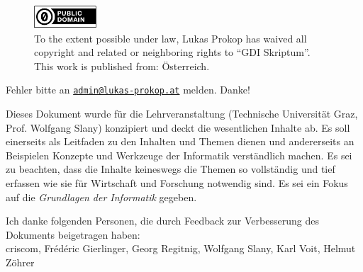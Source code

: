 \begin{titlepage}
  \begin{center}
    \begin{figure}[ht!]
      \begin{center}
        \includegraphics[width=88px,height=33px]{img/cc0.pdf} \\[20pt]%
        To the extent possible under law, Lukas Prokop has waived all copyright and related
        or neighboring rights to ``GDI Skriptum''. \\
        This work is published from: Österreich. 
      \end{center}
    \end{figure}
    \vspace{50pt}
    \noindent Fehler bitte an
    \href{mailto:admin@lukas-prokop.at}{\nolinkurl{admin@lukas-prokop.at}}
    melden. Danke!
    \vspace{50pt}

    Dieses Dokument wurde für die Lehrveranstaltung \courselfocs{}
    (Technische Universität Graz, Prof. Wolfgang Slany) konzipiert
    und deckt die wesentlichen Inhalte ab. Es soll einerseits als
    Leitfaden zu den Inhalten und Themen dienen und andererseits an Beispielen
    Konzepte und Werkzeuge der Informatik verständlich machen. Es sei zu beachten,
    dass die Inhalte keineswegs die Themen so vollständig und tief erfassen
    wie sie für Wirtschaft und Forschung notwendig sind. Es sei ein Fokus
    auf die \emph{Grundlagen der Informatik} gegeben.

    \vspace{50pt}
    Ich danke folgenden Personen, die durch Feedback zur Verbesserung
    des Dokuments beigetragen haben: \\[15pt]
    criscom, Frédéric Gierlinger, Georg Regitnig, Wolfgang Slany, Karl Voit,
    Helmut Zöhrer
  \end{center}
\end{titlepage}

